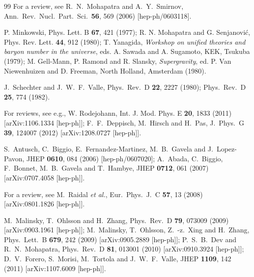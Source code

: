 \documentclass[reprint,prl,twocolumn,superscriptaddress,showpacs,nofootinbib,floatfix,preprintnumbers]{revtex4-1}
\begin{document}
 
\begin{thebibliography}{99}
 For a review, see R.~N.~Mohapatra and A.~Y.~Smirnov,
  Ann.\ Rev.\ Nucl.\ Part.\ Sci.\  {\bf 56}, 569 (2006) [hep-ph/0603118]. 

 P. Minkowski, Phys. Lett. B {\bf 67}, 421 (1977); 
R. N. Mohapatra and G. Senjanovi\'{c}, Phys. Rev. Lett. {\bf 44}, 912 (1980);  
T. Yanagida, {\it Workshop on unified theories and baryon number in
  the universe}, eds. A. Sawada and A. Sugamoto, KEK, Tsukuba (1979);  
M. Gell-Mann, P. Ramond and R. Slansky, {\it Supergravity}, ed. P. Van
Niewenhuizen and D. Freeman, North Holland, Amsterdam (1980).   

   
J.~Schechter and J.~W.~F.~Valle,
  Phys.\ Rev.\ D {\bf 22}, 2227 (1980); 
  Phys.\ Rev.\ D {\bf 25}, 774 (1982).

 For reviews, see e.g., W. Rodejohann, Int. J. Mod. Phys. E {\bf 20}, 1833 (2011) 
[arXiv:1106.1334 [hep-ph]]; 
F.~F.~Deppisch, M.~Hirsch and H.~Pas,
  J.\ Phys.\ G {\bf 39}, 124007 (2012) [arXiv:1208.0727 [hep-ph]].

 
S.~Antusch, C.~Biggio, E.~Fernandez-Martinez, M.~B.~Gavela and J.~Lopez-Pavon,
  JHEP {\bf 0610}, 084 (2006) [hep-ph/0607020]; 
A.~Abada, C.~Biggio, F.~Bonnet, M.~B.~Gavela and T.~Hambye,
  JHEP {\bf 0712}, 061 (2007) [arXiv:0707.4058 [hep-ph]].

 For a review, see  M.~Raidal {\it et al.},
  Eur.\ Phys.\ J.\ C {\bf 57}, 13 (2008) [arXiv:0801.1826 [hep-ph]]. 

M.~Malinsky, T.~Ohlsson and H.~Zhang,
  Phys.\ Rev.\ D {\bf 79}, 073009 (2009) [arXiv:0903.1961 [hep-ph]]; 
M.~Malinsky, T.~Ohlsson, Z.~-z.~Xing and H.~Zhang,
  Phys.\ Lett.\ B {\bf 679}, 242 (2009) [arXiv:0905.2889 [hep-ph]];   
P.~S.~B.~Dev and R.~N.~Mohapatra,
  Phys.\ Rev.\ D {\bf 81}, 013001 (2010) [arXiv:0910.3924 [hep-ph]]; 
D.~V.~Forero, S.~Morisi, M.~Tortola and J.~W.~F.~Valle,
  JHEP {\bf 1109}, 142 (2011) [arXiv:1107.6009 [hep-ph]].


\end{thebibliography}
\end{document}
